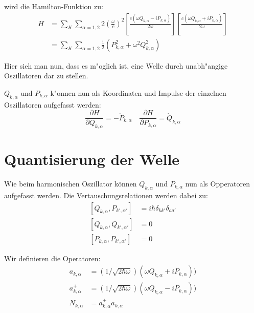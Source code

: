 wird die Hamilton-Funktion zu:
\begin{equation} \label{fq:hamilton}
\begin{split}
H &= \sum_K \sum_{\alpha=1,2} 2 \left(\frac{\omega}{c}\right)^2 \left[ \frac{c(\omega Q_{k,\alpha} - i P_{k,\alpha})}{2 \omega} \right] \left[ \frac{c(\omega Q_{k,\alpha} + i P_{k,\alpha})}{2 \omega} \right] \\
&= \sum_K \sum_{\alpha=1,2} \frac{1}{2} (P_{k,\alpha}^2 + \omega^2 Q_{k,\alpha}^2)
\end{split}
\end{equation}

Hier sieh man nun, dass es m"oglich ist, eine Welle durch unabh"angige Oszillatoren dar zu stellen.

$Q_{k,\alpha}$ und $P_{k,\alpha}$ k"onnen nun als Koordinaten und Impulse der einzelnen Oszillatoren aufgefasst werden:
\begin{equation}
\dfrac{\partial H}{\partial Q_{k,\alpha}} = -\dot{P}_{k,\alpha} \quad \dfrac{\partial H}{\partial P_{k,\alpha}} = \dot{Q}_{k,\alpha}
\end{equation}

\section{Quantisierung der Welle}

Wie beim harmonischen Oszillator können $Q_{k,\alpha}$ und $P_{k,\alpha}$ nun als Opperatoren aufgefasst werden. Die Vertauschungsrelationen werden dabei zu:
\begin{equation}
\begin{split}
[Q_{k,\alpha}, P_{k',\alpha'}] &= i \hbar \delta_{kk'}\delta_{aa'} \\
[Q_{k,\alpha}, Q_{k',\alpha'}] &= 0 \\
[P_{k,\alpha}, P_{k',\alpha'}] &= 0
\end{split}
\end{equation}

Wir definieren die Operatoren:
\begin{equation}
\begin{split}
a_{k,\alpha} &= (1/\sqrt{2 \hbar \omega})(\omega Q_{k,\alpha} + iP_{k,\alpha})) \\
a^+_{k,\alpha} &= (1/\sqrt{2 \hbar \omega})(\omega Q_{k,\alpha} - iP_{k,\alpha}))\\
N_{k,\alpha} &= a^+_{k,\alpha} a_{k,\alpha}
\end{split}
\end{equation}

